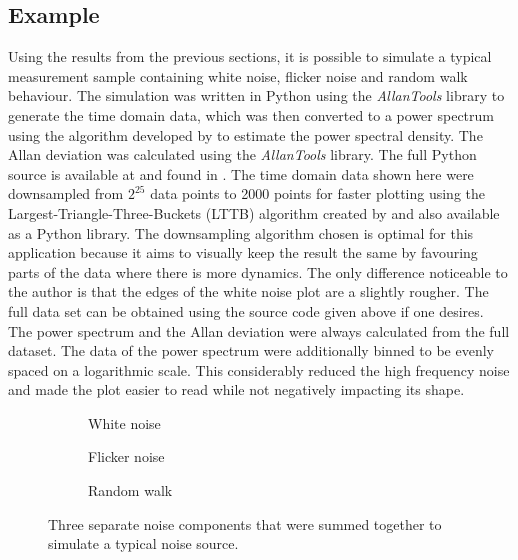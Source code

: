 \subsection{Example}%
\label{sec:noise_example}
Using the results from the previous sections, it is possible to simulate a typical measurement sample containing white noise, flicker noise and random walk behaviour. The simulation was written in Python using the \textit{AllanTools} library \cite{allantools} to generate the time domain data, which was then converted to a power spectrum using the algorithm developed by \citeauthor{welch} \cite{welch} to estimate the power spectral density. The Allan deviation was calculated using the \textit{AllanTools} library. The full Python source is available at \cite{supplemental_material} and found in . The time domain data shown here were downsampled from $2^{25}$ data points to \num{2000} points for faster plotting using the Largest-Triangle-Three-Buckets (LTTB) algorithm created by \citeauthor{lttb} \cite{lttb} and also available as a Python library. The downsampling algorithm chosen is optimal for this application because it aims to visually keep the result the same by favouring parts of the data where there is more dynamics. The only difference noticeable to the author is that the edges of the white noise plot are a slightly rougher. The full data set can be obtained using the source code given above if one desires. The power spectrum and the Allan deviation were always calculated from the full dataset. The data of the power spectrum were additionally binned to be evenly spaced on a logarithmic scale. This considerably reduced the high frequency noise and made the plot easier to read while not negatively impacting its shape.
\begin{figure}[ht]
    \centering
    \begin{subfigure}{0.32\linewidth}
        \centering
        \scalebox{0.75}{%
        } %
        \caption{White noise}
    \end{subfigure}
    \begin{subfigure}{0.32\linewidth}
        \centering
        \scalebox{0.75}{%
        } %
        \caption{Flicker noise}
    \end{subfigure}
    \begin{subfigure}{0.32\linewidth}
        \centering
        \scalebox{0.75}{%
        } %
        \caption{Random walk}
    \end{subfigure}
    \caption{Three separate noise components that were summed together to simulate a typical noise source.}
    \label{fig:adev_example_noise_types}
\end{figure}

